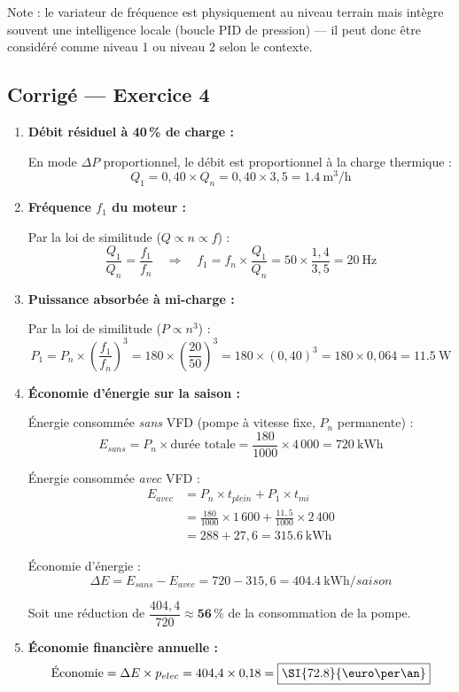 \begin{methode}
Note : le variateur de fréquence est physiquement au niveau terrain mais intègre souvent une intelligence locale (boucle PID de pression) — il peut donc être considéré comme niveau 1 ou niveau 2 selon le contexte.
\end{methode}

\subsection*{Corrigé — Exercice 4}

\begin{enumerate}
  \item \textbf{Débit résiduel à 40\,\% de charge :}

  En mode $\Delta P$ proportionnel, le débit est proportionnel à la charge thermique :
  \[
    Q_1 = 0{,}40 \times Q_n = 0{,}40 \times 3{,}5 = \boxed{\SI{1.4}{\cubic\metre\per\hour}}
  \]

  \item \textbf{Fréquence $f_1$ du moteur :}

  Par la loi de similitude ($Q \propto n \propto f$) :
  \[
    \frac{Q_1}{Q_n} = \frac{f_1}{f_n}
    \quad\Rightarrow\quad
    f_1 = f_n \times \frac{Q_1}{Q_n} = 50 \times \frac{1{,}4}{3{,}5} = \boxed{\SI{20}{\hertz}}
  \]

  \item \textbf{Puissance absorbée à mi-charge :}

  Par la loi de similitude ($P \propto n^3$) :
  \[
    P_1 = P_n \times \left(\frac{f_1}{f_n}\right)^3 = 180 \times \left(\frac{20}{50}\right)^3
         = 180 \times (0{,}40)^3 = 180 \times 0{,}064 = \boxed{\SI{11.5}{\watt}}
  \]

  \item \textbf{Économie d'énergie sur la saison :}

  Énergie consommée \textit{sans} VFD (pompe à vitesse fixe, $P_n$ permanente) :
  \[
    E_{sans} = P_n \times \text{durée totale} = \frac{180}{1000} \times 4\,000 = \SI{720}{\kilo\watt\hour}
  \]

  Énergie consommée \textit{avec} VFD :
  \begin{align*}
    E_{avec} &= P_n \times t_{plein} + P_1 \times t_{mi} \\
             &= \frac{180}{1000} \times 1\,600 + \frac{11{,}5}{1000} \times 2\,400 \\
             &= 288 + 27{,}6 = \SI{315.6}{\kilo\watt\hour}
  \end{align*}

  Économie d'énergie :
  \[
    \Delta E = E_{sans} - E_{avec} = 720 - 315{,}6 = \boxed{\SI{404.4}{\kilo\watt\hour/saison}}
  \]

  Soit une réduction de $\dfrac{404{,}4}{720} \approx \mathbf{56\,\%}$ de la consommation de la pompe.

  \item \textbf{Économie financière annuelle :}
  \[
    \text{Économie} = \Delta E \times p_{elec} = 404{,}4 \times 0{,}18 = \boxed{\SI{72.8}{\euro\per\an}}
  \]
\end{enumerate}

